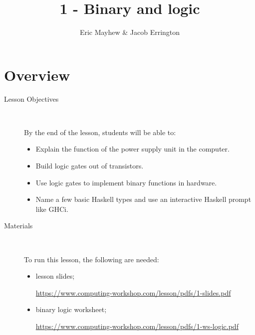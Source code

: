 \documentclass[11pt]{article}
\title{1 - Binary and logic}
\author{Eric Mayhew \& Jacob Errington}
\date{}
\newcommand{\cwurl}{https://www.computing-workshop.com/lesson/pdfs/}
\begin{document}
\maketitle

\section*{Overview}

\begin{description}
  \item[Lesson Objectives] ~

   By the end of the lesson, students will be able to:

  \begin{itemize}
    \item Explain the function of the power supply unit in the computer.


    \item Build logic gates out of transistors.

    \item Use logic gates to implement binary functions in hardware.

    \item Name a few basic Haskell types and use an interactive Haskell prompt
      like GHCi.
  \end{itemize}

  \item [Materials]~

    To run this lesson, the following are needed:

    \begin{itemize}
      \item
        lesson slides;

        \url{\cwurl 1-slides.pdf}

      \item
        binary logic worksheet;

        \url{\cwurl 1-ws-logic.pdf}
    \end{itemize}
\end{description}
\end{document}
